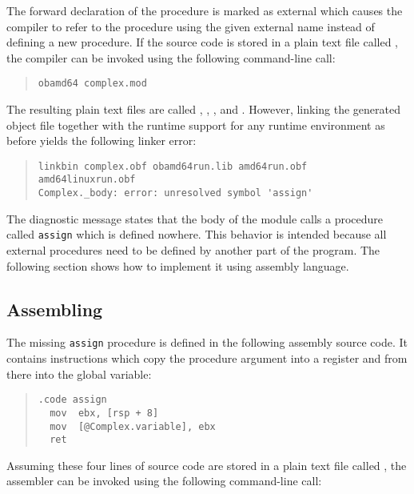The forward declaration of the procedure is marked as external which causes the compiler to refer to the procedure using the given external name instead of defining a new procedure.
If the source code is stored in a plain text file called , the compiler can be invoked using the following command-line call:

\begin{quote}\begin{verbatim}
obamd64 complex.mod
\end{verbatim}\end{quote}

The resulting plain text files are called , , , and .
However, linking the generated object file together with the runtime support for any runtime environment as before yields the following linker error:

\begin{quote}\begin{verbatim}
linkbin complex.obf obamd64run.lib amd64run.obf amd64linuxrun.obf
Complex._body: error: unresolved symbol 'assign'
\end{verbatim}\end{quote}

The diagnostic message states that the body of the module calls a procedure called \texttt{assign} which is defined nowhere.
This behavior is intended because all external procedures need to be defined by another part of the program.
The following section shows how to implement it using assembly language.

\subsection{Assembling}

The missing \texttt{assign} procedure is defined in the following assembly source code.
It contains instructions which copy the procedure argument into a register and from there into the global variable:

\begin{quote}\begin{verbatim}
.code assign
  mov  ebx, [rsp + 8]
  mov  [@Complex.variable], ebx
  ret
\end{verbatim}\end{quote}

Assuming these four lines of source code are stored in a plain text file called , the assembler can be invoked using the following command-line call:

